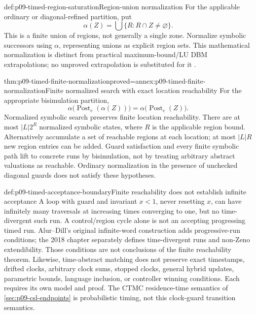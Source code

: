 \begin{hbdefinition}{def:p09-timed-region-saturation}{Region-union normalization}
For the applicable ordinary or diagonal-refined partition, put
\[
 \alpha(Z)=\bigcup\{R:R\cap Z\ne\varnothing\}.
\]
This is a finite union of regions, not generally a single zone. Normalize
symbolic successors using \(\alpha\), representing unions as explicit
region sets. This mathematical normalization is distinct from practical
maximum-bound/LU DBM extrapolations; no unproved extrapolation is substituted
for it \cite[\S29.7.1]{BouyerEtAl2018TimedChapter}.
\end{hbdefinition}

\begin{hbtheorem}{thm:p09-timed-finite-normalization}{proved=annex:p09-timed-finite-normalization}{Finite normalized search with exact location reachability}
For the appropriate bisimulation partition,
\[
 \alpha\bigl(\operatorname{Post}_e(\alpha(Z))\bigr)
       =\alpha\bigl(\operatorname{Post}_e(Z)\bigr).
\]
Normalized symbolic search preserves finite location reachability. There
are at most \(|L|2^{R}\) normalized symbolic states, where \(R\) is the
applicable region bound. Alternatively accumulate a set of reachable
regions at each location; at most \(|L|R\) new region entries can be added.
Guard satisfaction and every finite symbolic path lift to concrete runs by
bisimulation, not by treating arbitrary abstract valuations as reachable.
Ordinary normalization in the presence of unchecked diagonal guards does
not satisfy these hypotheses.
\end{hbtheorem}

\begin{hbwarning}{def:p09-timed-acceptance-boundary}{Finite reachability does not establish infinite acceptance}
A loop with guard and invariant \(x<1\), never resetting \(x\), can have
infinitely many traversals at increasing times converging to one, but no
time-divergent such run. A control/region cycle alone is not an accepting
progressing timed run. Alur--Dill's original infinite-word construction
adds progressive-run conditions; the 2018 chapter separately defines
time-divergent runs and non-Zeno extendibility. Those conditions are not
conclusions of the finite reachability theorem. Likewise, time-abstract
matching does not preserve exact timestamps, drifted clocks, arbitrary
clock sums, stopped clocks, general hybrid updates, parametric bounds,
language inclusion, or controller winning conditions. Each requires its
own model and proof. The CTMC residence-time semantics of
\cref{sec:p09-csl-endpoints} is probabilistic timing, not this clock-guard
transition semantics.
\end{hbwarning}
